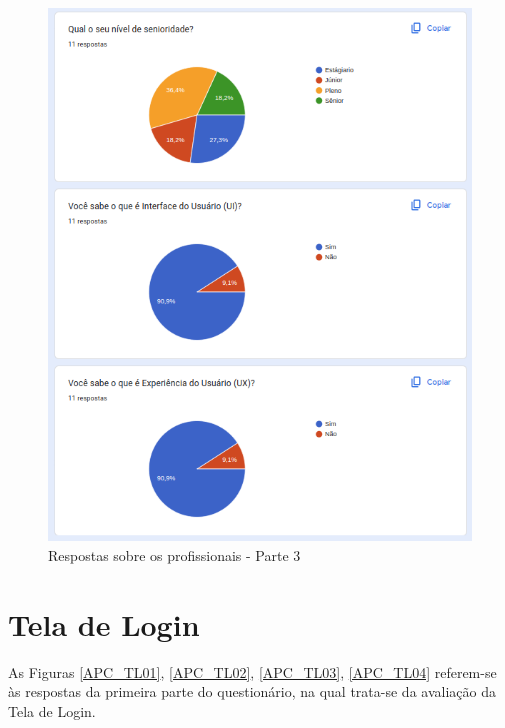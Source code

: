 \begin{figure}[!h]
	\begin{center}
	    \includegraphics[scale=0.7]{figs/Answers/Professionals/03.png}
	\end{center}
	\caption{\label{APC_03}Respostas sobre os profissionais - Parte 3}
\end{figure}

\newpage

\section{Tela de Login}

As Figuras \ref{APC_TL01}, \ref{APC_TL02}, \ref{APC_TL03}, \ref{APC_TL04} referem-se às respostas da primeira parte do questionário, na qual trata-se da avaliação da Tela de Login.

